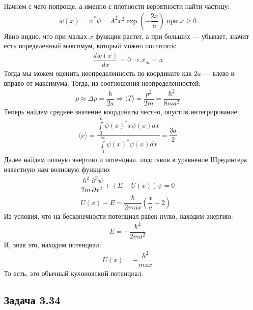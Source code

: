 \documentclass[12pt]{article}
\begin{document}
\vspace{1em} \noindent
Начнем с чего попроще, а именно с плотности вероятности найти частицу:
\begin{gather*}
    w(x) = \psi^*\psi = A^2x^2\exp{\left( -\dfrac{2x}{a}\right)} \text{ при }  x \ge 0
\end{gather*}
Явно видно, что при малых $x$ функция растет, а при больших --- убывает, значит есть определенный максимум, который можно посчитать:
\begin{gather*}
    \dfrac{dw(x)}{dx} = 0 \Rightarrow x_m = a
\end{gather*}
Тогда мы можем оценить неопределенность по координате как $2a$ --- влево и вправо от максимума. Тогда, из соотношения неопределенностей:
\begin{gather*}
    p \approx \Delta p = \dfrac{\hbar}{2a} \Rightarrow \langle T \rangle = \dfrac{p^2}{2m} = \dfrac{\hbar^2}{8ma^2}
\end{gather*}
Теперь найдем среднее значение координаты честно, опустив интегрирование:
\begin{gather*}
    \langle x \rangle = \dfrac{\int\limits_0^{\infty}\psi(x)^*x\psi(x)dx}{\int\limits_0^{\infty}\psi(x)^*\psi(x)dx} = \dfrac{3a}{2}
\end{gather*}
Далее найдем полную энергию и потенциал, подставив в уравнение Шредингера известную нам волновую функцию:
\begin{gather*}
    \dfrac{\hbar^2}{2m}\dfrac{\partial^2\psi}{\partial x^2} +  (E-U(x))\psi=0\\
    U(x) - E = \dfrac{\hbar}{2max}\left( \dfrac{x}{a} - 2 \right)
\end{gather*}
Из условия, что на бесконечности потенциал равен нулю, находим энергию:
\begin{gather*}
    E = -\dfrac{\hbar^2}{2ma^2}
\end{gather*}
И, зная это, находим потенциал:
\begin{gather*}
    U(x) = - \dfrac{\hbar^2}{max}
\end{gather*}
То есть, это обычный кулоновский потенциал.

\subsection{Задача 3.34}
\label{task_3.34}
\end{document}
